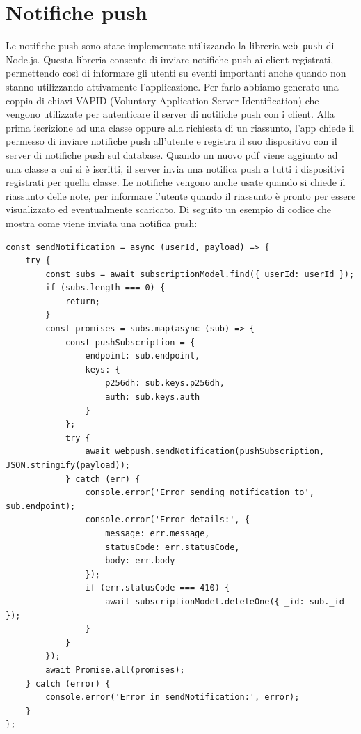 \section{Notifiche push}
Le notifiche push sono state implementate utilizzando la libreria \texttt{web-push} di Node.js. Questa libreria consente di inviare notifiche push ai client registrati, permettendo così di informare gli utenti su eventi importanti anche quando non stanno utilizzando attivamente l'applicazione. Per farlo abbiamo generato una coppia di chiavi VAPID (Voluntary Application Server Identification) che vengono utilizzate per autenticare il server di notifiche push con i client. Alla prima iscrizione ad una classe oppure alla richiesta di un riassunto, l'app chiede il permesso di inviare notifiche push all'utente e registra il suo dispositivo con il server di notifiche push sul database. Quando un nuovo pdf viene aggiunto ad una classe a cui si è iscritti, il server invia una notifica push a tutti i dispositivi registrati per quella classe. Le notifiche vengono anche usate quando si chiede il riassunto delle note, per informare l'utente quando il riassunto è pronto per essere visualizzato ed eventualmente scaricato.
Di seguito un esempio di codice che mostra come viene inviata una notifica push:

\begin{lstlisting}[style=javascript, caption=Invio notifica push]
const sendNotification = async (userId, payload) => {
    try {  
        const subs = await subscriptionModel.find({ userId: userId });    
        if (subs.length === 0) {
            return;
        }
        const promises = subs.map(async (sub) => {
            const pushSubscription = {
                endpoint: sub.endpoint,
                keys: {
                    p256dh: sub.keys.p256dh,
                    auth: sub.keys.auth
                }
            };
            try {
                await webpush.sendNotification(pushSubscription, JSON.stringify(payload));
            } catch (err) {
                console.error('Error sending notification to', sub.endpoint);
                console.error('Error details:', {
                    message: err.message,
                    statusCode: err.statusCode,
                    body: err.body
                });   
                if (err.statusCode === 410) {
                    await subscriptionModel.deleteOne({ _id: sub._id });
                }
            }
        });
        await Promise.all(promises);
    } catch (error) {
        console.error('Error in sendNotification:', error);
    }
};
\end{lstlisting}

